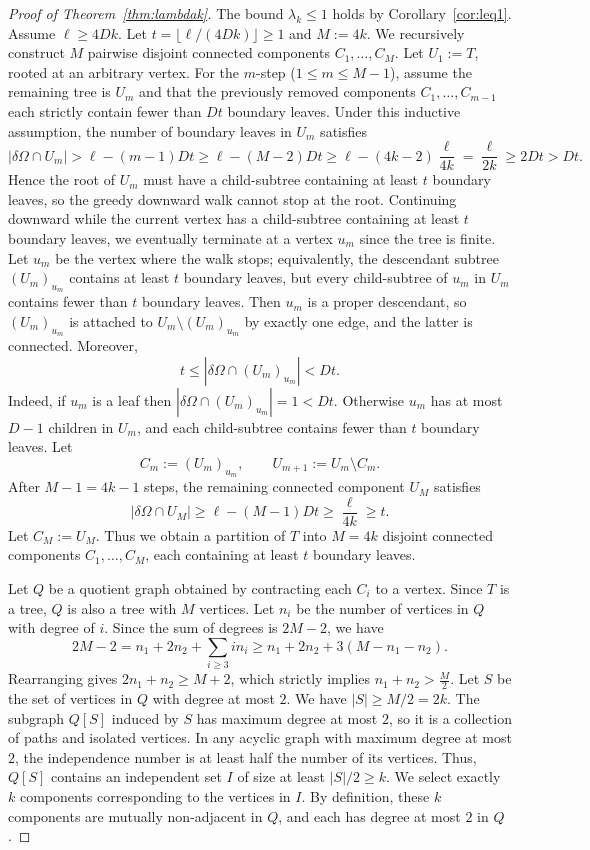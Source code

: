 \documentclass[11pt]{article}
\theoremstyle{definition}
\theoremstyle{remark}
\newcommand{\dO}{\delta\Omega}
\begin{document}
\begin{proof}[Proof of Theorem~\ref{thm:lambdak}]
The bound $\lambda_k\le 1$ holds by Corollary~\ref{cor:leq1}.
Assume $\ell\ge 4Dk$. Let  $t=\lfloor\ell/(4Dk)\rfloor\ge 1$ and $M:=4k$.
We recursively construct $M$ pairwise disjoint connected components $C_1,\dots,C_M$.
Let $U_1:=T$, rooted at an arbitrary vertex. For the $m$-step ($1\le m\le M-1$), assume the remaining tree is $U_m$ and that the previously removed components $C_1, \dots, C_{m-1}$ each strictly contain fewer than $Dt$ boundary leaves. Under this inductive assumption, the number of boundary leaves in $U_m$ satisfies  
$$|\dO\cap U_m|>\ell-(m-1)Dt\ge
\ell-(M-2)Dt\ge
\ell-(4k-2)\frac{\ell}{4k}=
\frac{\ell}{2k}\ge 2Dt>Dt.$$
Hence the root of $U_m$ must have a child-subtree containing at least $t$
boundary leaves, so the greedy downward walk cannot stop at the root. Continuing downward while the current vertex has a child-subtree containing at least $t$ boundary
leaves, we eventually terminate at a vertex $u_m$ since the tree is finite.
Let $u_m$ be the vertex where the walk stops; equivalently,
the descendant subtree $(U_m)_{u_m}$ contains at least $t$ boundary leaves,
but every child-subtree of $u_m$ in $U_m$ contains fewer than $t$ boundary leaves.
Then $u_m$ is a proper descendant, so $(U_m)_{u_m}$ is attached to
$U_m\setminus (U_m)_{u_m}$ by exactly one edge, and the latter is connected.
Moreover, $$t\le |\dO\cap (U_m)_{u_m}|<Dt.$$
Indeed, if $u_m$ is a leaf then $|\dO\cap (U_m)_{u_m}|=1<Dt$.
Otherwise $u_m$ has at most $D-1$ children in $U_m$, and each child-subtree
contains fewer than $t$ boundary leaves. Let $$C_m:=(U_m)_{u_m},
\qquad
U_{m+1}:=U_m\setminus C_m.$$ After $M-1=4k-1$ steps, the remaining connected component $U_M$ satisfies $$|\dO\cap U_M|
\ge \ell-(M-1)Dt\ge\frac{\ell}{4k}\ge t.$$ Let $C_M:=U_M$. Thus we obtain a partition of $T$ into $M=4k$ disjoint connected components $C_1,\dots,C_M$, each containing at least $t$
boundary leaves.

Let $Q$ be a quotient graph obtained by contracting each $C_i$ to a vertex. Since $T$ is a tree, $Q$ is also a tree with $M$ vertices.
Let $n_i$ be the number of vertices in $Q$ with degree of $i$. Since the sum of degrees is $2M-2$, we have
$$
2M-2 = n_1 + 2n_2 + \sum_{i\ge 3} i n_i \ge n_1 + 2n_2 + 3(M - n_1 - n_2).
$$
Rearranging gives $2n_1+n_2\ge M+2$, which strictly implies $n_1+n_2>\frac{M}{2}$. Let $S$ be the set of vertices in $Q$ with degree at most $2$. We have $|S| \ge M/2 = 2k$.  
The subgraph $Q[S]$ induced by $S$ has maximum degree at most $2$, so it is a collection of paths and isolated vertices. In any acyclic graph with maximum degree at most $2$, the independence number is at least half the number of its vertices. Thus, $Q[S]$ contains an independent set $I$ of size at least $|S|/2 \ge k$. We select exactly $k$ components corresponding to the vertices in $I$. By definition, these $k$ components are mutually non-adjacent in $Q$, and each has degree at most $2$ in $Q$.


\end{proof}
\end{document}
